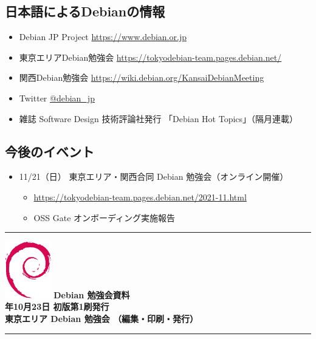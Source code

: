 \documentclass[mingoth,a4paper]{jsarticle}
\newcommand{\debmtgyear}{2021}
\newcommand{\debmtgmonth}{10}
\newcommand{\debmtgdate}{23}
\begin{document}

\subsection{日本語によるDebianの情報}


\begin{itemize}
\item Debian JP Project \url{https://www.debian.or.jp}
\item 東京エリアDebian勉強会 \url{https://tokyodebian-team.pages.debian.net/}
\item 関西Debian勉強会 \url{https://wiki.debian.org/KansaiDebianMeeting}
\item Twitter \url{@debian_jp}
\item 雑誌 Software Design 技術評論社発行 「Debian Hot Topics」（隔月連載）
\end{itemize}


\subsection{今後のイベント}


\begin{itemize}
\item 11/21（日） 東京エリア・関西合同 Debian 勉強会（オンライン開催）
  \begin{itemize}
  \item \url{https://tokyodebian-team.pages.debian.net/2021-11.html}
  \item OSS Gate オンボーディング実施報告
  \end{itemize}
\end{itemize}



\mbox{}\newpage

\vspace*{15cm}
\hrule
\vspace{2mm}
\includegraphics[width=2cm]{image-assets/openlogo-nd.eps}
\noindent \Large \bf Debian 勉強会資料\\
\noindent \normalfont \debmtgyear{}年\debmtgmonth{}月\debmtgdate{}日 \hspace{5mm}  初版第1刷発行\\
\noindent \normalfont 東京エリア Debian 勉強会 （編集・印刷・発行）\\
\hrule
\end{document}
